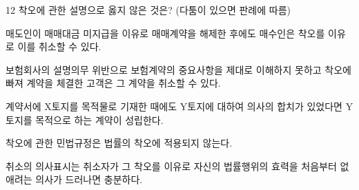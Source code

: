 \begin{question}{12}
착오에 관한 설명으로 옳지 않은 것은? (다툼이 있으면 판례에 따름)
\begin{choices}
  \item 매도인이 매매대금 미지급을 이유로 매매계약을 해제한 후에도 매수인은 착오를 이유로 이를 취소할 수 있다.
  \item 보험회사의 설명의무 위반으로 보험계약의 중요사항을 제대로 이해하지 못하고 착오에 빠져 계약을 체결한 고객은 그 계약을 취소할 수 있다.
  \item 계약서에 X토지를 목적물로 기재한 때에도 Y토지에 대하여 의사의 합치가 있었다면 Y토지를 목적으로 하는 계약이 성립한다.
  \item 착오에 관한 민법규정은 법률의 착오에 적용되지 않는다.
  \item 취소의 의사표시는 취소자가 그 착오를 이유로 자신의 법률행위의 효력을 처음부터 없애려는 의사가 드러나면 충분하다.
\end{choices}
\end{question}
